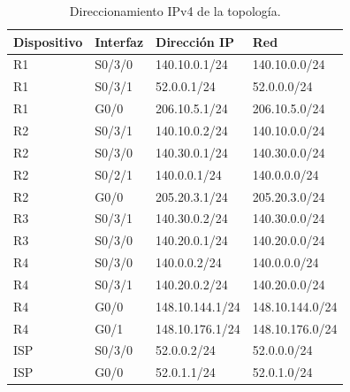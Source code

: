\documentclass[12pt,a4paper]{article}
\begin{document}
\begin{table}[H]
\centering
\caption{Direccionamiento IPv4 de la topología.}
\label{tab:direccionamiento}
\small

\begin{tabular}{llll}
\toprule
Dispositivo & Interfaz & Dirección IP & Red \\
\midrule
R1 & S0/3/0 & 140.10.0.1/24 & 140.10.0.0/24 \\
R1 & S0/3/1 & 52.0.0.1/24 & 52.0.0.0/24 \\
R1 & G0/0 & 206.10.5.1/24 & 206.10.5.0/24 \\
\midrule
R2 & S0/3/1 & 140.10.0.2/24 & 140.10.0.0/24 \\
R2 & S0/3/0 & 140.30.0.1/24 & 140.30.0.0/24 \\
R2 & S0/2/1 & 140.0.0.1/24 & 140.0.0.0/24 \\
R2 & G0/0 & 205.20.3.1/24 & 205.20.3.0/24 \\
\midrule
R3 & S0/3/1 & 140.30.0.2/24 & 140.30.0.0/24 \\
R3 & S0/3/0 & 140.20.0.1/24 & 140.20.0.0/24 \\
\midrule
R4 & S0/3/0 & 140.0.0.2/24 & 140.0.0.0/24 \\
R4 & S0/3/1 & 140.20.0.2/24 & 140.20.0.0/24 \\
R4 & G0/0 & 148.10.144.1/24 & 148.10.144.0/24 \\
R4 & G0/1 & 148.10.176.1/24 & 148.10.176.0/24 \\
\midrule
ISP & S0/3/0 & 52.0.0.2/24 & 52.0.0.0/24 \\
ISP & G0/0 & 52.0.1.1/24 & 52.0.1.0/24 \\
\bottomrule
\end{tabular}
\end{table}
\end{document}
